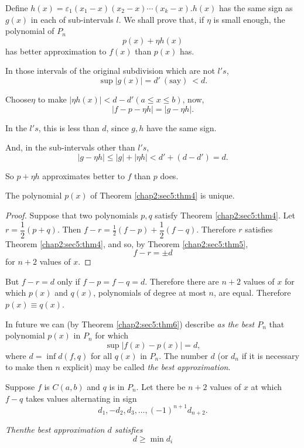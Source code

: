 Define $ h (x) = \varepsilon_1 (x_1 -x) (x_2 -x) \cdots (x_k - x
). h (x) $ has the same sign as $ g (x) $ in each of sub-intervals
$l$. We shall prove that, if $ \eta $ is small enough, the polynomial
of $ P_n $ 
$$
p (x) + \eta h (x)
$$
has better approximation to $ f (x) $ than $ p (x) $ has.

In those intervals of the original subdivision which are not $ l's $, 
$$
\sup | g (x) | = d' ~(\text{say})~ < d.
$$

Choose\pageoriginale $\eta$ to make $|\eta h(x)|<d-d' (a \leq x \le b)$, now,
$$
|f-p-\eta h|=|g-\eta h|.
$$

In the $l's$, this is less than $d$, since $g,h$ have the same sign.

And, in the sub-intervals other than $l's$,
$$
|g-\eta h|\leq |g|+|\eta h|<d' +(d-d')=d.
$$

So $p+\eta h$ approximates better to $f$ than $p$ does.

\begin{theorem}\label{chap2:sec5:thm6} %
  The polynomial $p(x)$ of Theorem \ref{chap2:sec5:thm4} is unique.
\end{theorem}

\begin{proof}
  Suppose that two polynomials $p,q$ satisfy Theorem
  \ref{chap2:sec5:thm4}. Let $r= \dfrac{1}{2}(p+q)$. Then
  $f-r=\frac{1}{2}(f-p)+\dfrac{1}{2}(f-q)$. Therefore $r$ satisfies
  Theorem \ref{chap2:sec5:thm4}, and so, by Theorem \ref{chap2:sec5:thm5}, 
  $$
  f-r= \pm d
  $$
  for $n+2$ values of $x$.
\end{proof}

But $f-r=d$ only if $f-p=f-q=d$. Therefore there are $n+2$ values of
$x$ for which $p(x)$ and $q(x)$, polynomials of degree at most $n$,
are equal. Therefore $p(x)\equiv q(x)$. 

In future we can (by Theorem \ref{chap2:sec5:thm6}) describe
\textit{as the best $P_n$} that polynomial $p(x)$ in $P_n$ for which 
$$
\sup |f(x)-p(x)|=d,
$$
where $d=\inf d(f,q)$ for all $q(x)$ in $P_n$. The number $d$ (or
$d_n$ if it is necessary to make then $n$ explicit) may be called
\textit{the best approximation}. 

\begin{theorem}\label{chap2:sec5:thm7}%
  Suppose $f$ is $C(a,b)$ and $q$ is in $P_n$. Let there be $n+2$
  values of $x$ at which $f-q$ takes values alternating in sign 
  $$
  d_1,-d_2,d_3,\ldots, (-1)^{n+1}d_{n+2}.
  $$

  \textit{Then\pageoriginale the best approximation $d$ satisfies}
  $$
  d \geq \min d_i
  $$
\end{theorem}

